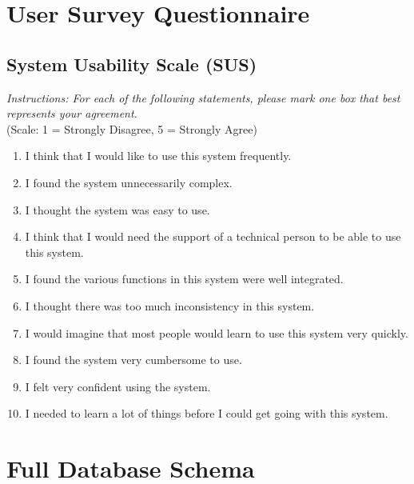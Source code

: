 \chapter{User Survey Questionnaire}
\label{app:sus}

\section*{System Usability Scale (SUS)}
\textit{Instructions: For each of the following statements, please mark one box that best represents your agreement.} \\
(Scale: 1 = Strongly Disagree, 5 = Strongly Agree)

\begin{enumerate}
    \item I think that I would like to use this system frequently.
    \item I found the system unnecessarily complex.
    \item I thought the system was easy to use.
    \item I think that I would need the support of a technical person to be able to use this system.
    \item I found the various functions in this system were well integrated.
    \item I thought there was too much inconsistency in this system.
    \item I would imagine that most people would learn to use this system very quickly.
    \item I found the system very cumbersome to use.
    \item I felt very confident using the system.
    \item I needed to learn a lot of things before I could get going with this system.
\end{enumerate}

\cleardoublepage

\chapter{Full Database Schema}
\label{app:db-schema}

